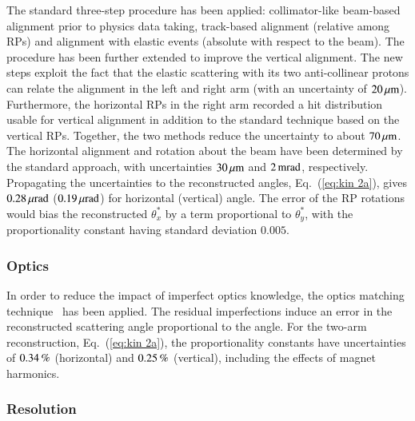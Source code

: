 The standard three-step procedure \cite{totem-ijmp} has been applied: collimator-like beam-based alignment prior to physics data taking, track-based alignment (relative among RPs) and alignment with elastic events (absolute with respect to the beam). The procedure has been further extended to improve the vertical alignment. The new steps exploit the fact that the elastic scattering with its two anti-collinear protons can relate the alignment in the left and right arm (with an uncertainty of $20\,{\rm \mu m}$). Furthermore, the horizontal RPs in the right arm recorded a hit distribution usable for vertical alignment in addition to the standard technique based on the vertical RPs. Together, the two methods reduce the uncertainty to about $70\,{\rm \mu m}$. The horizontal alignment and rotation about the beam have been determined by the standard approach, with uncertainties $30\,{\rm \mu m}$ and $2\,{\rm m rad}$, respectively. Propagating the uncertainties to the reconstructed angles, Eq.~(\ref{eq:kin 2a}), gives $0.28\,{\rm \mu rad}$ ($0.19\,{\rm \mu rad}$) for horizontal (vertical) angle. The error of the RP rotations would bias the reconstructed $\theta_x^*$ by a term proportional to $\theta_y^*$, with the proportionality constant having standard deviation $0.005$.



\subsubsection{Optics}
\label{sec:optics}
%
In order to reduce the impact of imperfect optics knowledge, the optics matching technique~\cite{totem-optics} has been applied. The residual imperfections induce an error in the reconstructed scattering angle proportional to the angle. For the two-arm reconstruction, Eq.~(\ref{eq:kin 2a}), the proportionality constants have uncertainties of $0.34\,{\rm \%}$ (horizontal) and $0.25\,{\rm \%}$ (vertical), including the effects of magnet harmonics.


\subsubsection{Resolution}
\label{sec:resolution}

